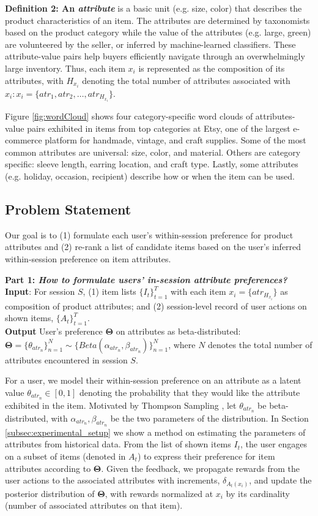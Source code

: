 \documentclass[11pt, dvipdfmx]{article}
\begin{document}
\noindent\textbf{Definition 2: An \textit{attribute}} is a basic unit (e.g. size, color) that describes the product characteristics of an item. The attributes are determined by taxonomists based on the product category while the value of the attributes (e.g. large, green) are volunteered by the seller, or inferred by machine-learned classifiers. 
These attribute-value pairs help buyers efficiently navigate through an overwhelmingly large inventory. Thus, each item $x_i$ is represented as the composition of its attributes, with $H_{x_i}$ denoting the total number of attributes associated with $x_i: x_i=\{atr_1,atr_2,\dots,atr_{H_{x_i}}\}.$

Figure \ref{fig:wordCloud} shows four category-specific word clouds of attributes-value pairs exhibited in items from top categories at Etsy, one of the largest e-commerce platform for handmade, vintage, and craft supplies. Some of the most common attributes are universal: 
size, color, and material. Others are category specific: sleeve length, earring location, and craft type. Lastly, some attributes (e.g. holiday, occasion, recipient) describe how or when the item can be used. 


\subsection{Problem Statement}
Our goal is to (1) formulate each user's within-session preference for product attributes and (2) re-rank a list of candidate items based on the user's inferred within-session preference on item attributes.

\noindent \textbf{Part 1: \textit{How to formulate users' in-session attribute preferences?}}\\
\noindent \textbf{Input}: For session $S$, (1) item lists $\{I_t\}_{t=1}^T$ with each item $x_i=\{atr_{H_{x_i}}\}$ as composition of product attributes; and (2) session-level record of user actions on shown items, $\{A_t\}_{t=1}^T$. \\
\noindent \textbf{Output} User's preference $\mathbf{\Theta}$ on attributes as beta-distributed:  $\mathbf{\Theta}=\{\theta_{atr_n}\}_{n=1}^N \sim \{Beta(\alpha_{atr_n},\beta_{atr_n})\}_{n=1}^N$, where $N$ denotes the total number of attributes encountered in session $S$. 

For a user, we model their within-session preference on an attribute as a latent value $\theta_{atr_n} \in [0,1]$ denoting the probability that they would like the attribute exhibited in the item. 
Motivated by Thompson Sampling \cite{agrawal2012analysis}, let $\theta_{atr_n}$ be beta-distributed, with $\alpha_{atr_n}, \beta_{atr_n}$ be the two parameters of the distribution. In Section \ref{subsec:experimental_setup} we show a method on estimating the parameters of attributes from historical data. From the list of shown items $I_t$, the user engages on a subset of items (denoted in $A_t$) to express their preference for item attributes according to $\mathbf{\Theta}$. Given the feedback, we propagate rewards from the user actions to the associated attributes with increments, $\delta_{A_t(x_i)}$, and update the posterior distribution of $\mathbf{\Theta}$, with rewards normalized at $x_i$ by its cardinality (number of associated attributes on that item). 
\end{document}
